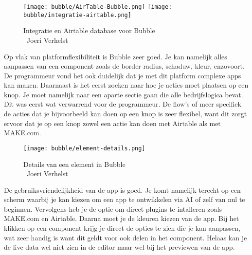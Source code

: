\begin{figure}[H]
    \texttt{[image: bubble/AirTable-Bubble.png]}
    \texttt{[image: bubble/integratie-airtable.png]}
    \caption[Integratie en Airtable database voor Bubble]{Integratie en Airtable database voor Bubble\\\textcopyright\ Joeri Verhelst}
    \label{fig:airtable-bubble}
\end{figure}
Op vlak van platformflexibiliteit is Bubble zeer goed. Je kan namelijk alles aanpassen van een component zoals de border radius, schaduw, kleur, enzovoort. 
De programmeur vond het ook duidelijk dat je met dit platform complexe apps kan maken. Daarnaast is het eerst zoeken naar hoe je acties moet plaatsen op een knop.
Je moet namelijk naar een aparte sectie gaan die alle bedrijfslogica bevat. Dit was eerst wat verwarrend voor de programmeur. De flow's of meer specifiek de acties dat je bijvoorbeeld kan doen op een 
knop is zeer flexibel, want dit zorgt ervoor dat je op een knop zowel een actie kan doen met Airtable als met MAKE.com.
\\

\begin{figure}[H]
    \texttt{[image: bubble/element-details.png]}
    \caption[Details van een element in Bubble]{Details van een element in Bubble\\\textcopyright\ Joeri Verhelst}
    \label{fig:element-bubble}
\end{figure}
De gebruiksvriendelijkheid van de app is goed. Je komt namelijk terecht
op een scherm waarbij je kan kiezen om een app te ontwikkelen via AI of zelf van nul te beginnen. 
Vervolgens heb je de optie om direct plugins te intalleren zoals MAKE.com en Airtable. Daarna moet je de kleuren kiezen van de app.
Bij het klikken op een component krijg je direct de opties te zien die je kan aanpassen, wat zeer handig is want dit geldt voor ook delen in het component. Helaas 
kan je de live data wel niet zien in de editor maar wel bij het previewen van de app.
\\
\\
